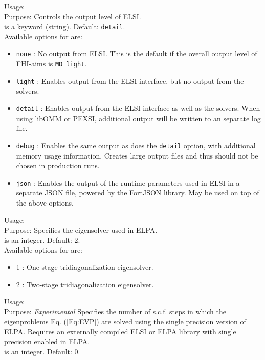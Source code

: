 {
  \noindent
  Usage:   \\[1.0ex]
  Purpose: Controls the output level of ELSI. \\[1.0ex]
   is a keyword (string). Default: \texttt{detail}. \\
}
Available options for  are:
\begin{itemize}
  \item \texttt{none} : No output from ELSI. This is the default if the overall
    output level of FHI-aims is \texttt{MD\_light}.
  \item \texttt{light} : Enables output from the ELSI interface, but no output
    from the solvers.
  \item \texttt{detail} : Enables output from the ELSI interface as well as the
    solvers. When using libOMM or PEXSI, additional output will be written to an
    separate log file.
  \item \texttt{debug} : Enables the same output as does the \texttt{detail}
    option, with additional memory usage information. Creates large output files
    and thus should not be chosen in production runs.
  \item \texttt{json} : Enables the output of the runtime parameters used in
    ELSI in a separate JSON file, powered by the FortJSON library. May be used
    on top of the above options.
\end{itemize}

{
  \noindent
  Usage:   \\[1.0ex]
  Purpose: Specifies the eigensolver used in ELPA. \\[1.0ex]
   is an integer. Default: 2. \\
}
Available options for  are:
\begin{itemize}
  \item 1 : One-stage tridiagonalization eigensolver.
  \item 2 : Two-stage tridiagonalization eigensolver.
\end{itemize}

{
  \noindent
  Usage:   \\[1.0ex]
  Purpose: \emph{Experimental} Specifies the number of s.c.f. steps in which the
    eigenproblems Eq. (\ref{Eq:EVP}) are solved using the single precision
    version of ELPA. Requires an externally compiled ELSI or ELPA library with
    single precision enabled in ELPA. \\[1.0ex]
   is an integer. Default: 0. \\
}

